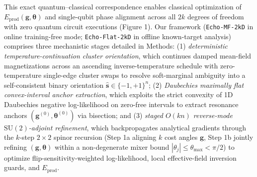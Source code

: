 \documentclass[10pt,a4paper]{article}
\begin{document}
This exact quantum--classical correspondence enables classical optimization of $E_{\mathrm{prod}}(\boldsymbol{g}, \boldsymbol{\theta})$ and single-qubit phase alignment across all $2k$ degrees of freedom with zero quantum circuit executions (Figure 1). Our framework (\texttt{Echo-MF-2kD} in online training-free mode; \texttt{Echo-Flat-2kD} in offline known-target analysis) comprises three mechanistic stages detailed in Methods: (1) \emph{deterministic temperature-continuation cluster orientation}, which continues damped mean-field magnetizations across an ascending inverse-temperature schedule with zero-temperature single-edge cluster swaps to resolve soft-marginal ambiguity into a self-consistent binary orientation $\hat{\boldsymbol{s}} \in \{-1, +1\}^n$; (2) \emph{Daubechies maximally flat convex-interval anchor extraction}, which exploits the strict convexity of 1D Daubechies negative log-likelihood on zero-free intervals to extract resonance anchors $(\boldsymbol{g}^{(0)}, \boldsymbol{\theta}^{(0)})$ via bisection; and (3) \emph{staged $O(kn)$ reverse-mode $\mathrm{SU}(2)$-adjoint refinement}, which backpropagates analytical gradients through the $k$-step $2\times 2$ spinor recursion (Step 1a aligning $k$ cost angles $\boldsymbol{g}$, Step 1b jointly refining $(\boldsymbol{g}, \boldsymbol{\theta})$ within a non-degenerate mixer bound $|\theta_j| \le \theta_{\max} < \pi/2$) to optimize flip-sensitivity-weighted log-likelihood, local effective-field inversion guards, and $E_{\mathrm{prod}}$.
\end{document}
